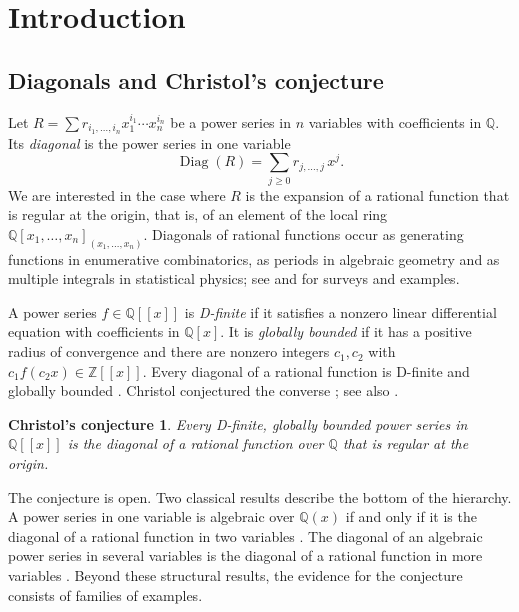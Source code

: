 \documentclass[11pt]{amsart}
\newtheorem*{conjecture*}{Christol's conjecture}
\theoremstyle{definition}
\theoremstyle{remark}
\numberwithin{equation}{section}
\newcommand{\Q}{\mathbb{Q}}
\newcommand{\Z}{\mathbb{Z}}
\DeclareMathOperator{\Diag}{Diag}
\begin{document}
\section{Introduction}\label{sec:intro}

\subsection{Diagonals and Christol's conjecture}
Let $R=\sum r_{i_1,\dots,i_n}x_1^{i_1}\cdots x_n^{i_n}$ be a power series in $n$ variables with coefficients in $\Q$. Its \emph{diagonal} is the power series in one variable
\[
\Diag(R)=\sum_{j\ge0}r_{j,\dots,j}\,x^j .
\]
We are interested in the case where $R$ is the expansion of a rational function that is regular at the origin, that is, of an element of the local ring $\Q[x_1,\dots,x_n]_{(x_1,\dots,x_n)}$. Diagonals of rational functions occur as generating functions in enumerative combinatorics, as periods in algebraic geometry and as multiple integrals in statistical physics; see \citet{Christol2015} and \citet{BostanEtAl2013} for surveys and examples.

A power series $f\in\Q[[x]]$ is \emph{D-finite} if it satisfies a nonzero linear differential equation with coefficients in $\Q[x]$. It is \emph{globally bounded} if it has a positive radius of convergence and there are nonzero integers $c_1,c_2$ with $c_1f(c_2x)\in\Z[[x]]$. Every diagonal of a rational function is D-finite \citep{Christol1985,Lipshitz1988} and globally bounded \citep{Christol1990}. Christol conjectured the converse \citep{Christol1987,Christol1990}; see also \citet[Conjecture~10]{Christol2015}.

\begin{conjecture*}
Every D-finite, globally bounded power series in $\Q[[x]]$ is the diagonal of a rational function over $\Q$ that is regular at the origin.
\end{conjecture*}

The conjecture is open. Two classical results describe the bottom of the hierarchy. A power series in one variable is algebraic over $\Q(x)$ if and only if it is the diagonal of a rational function in two variables \citep{Polya1922,Furstenberg1967}. The diagonal of an algebraic power series in several variables is the diagonal of a rational function in more variables \citep{DenefLipshitz1987}. Beyond these structural results, the evidence for the conjecture consists of families of examples.
\end{document}

